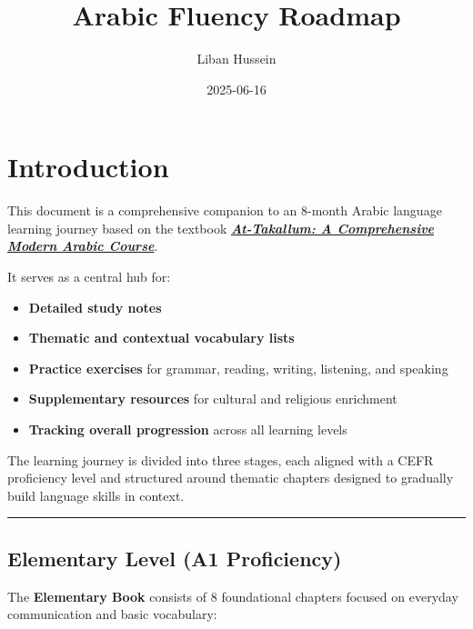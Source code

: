 \documentclass[
  a4paper,
  DIV=11,
  numbers=noendperiod]{scrartcl}
\title{Arabic Fluency Roadmap}
\author{Liban Hussein}
\date{2025-06-16}
\providecommand{\tightlist}{%
  \setlength{\itemsep}{0pt}\setlength{\parskip}{0pt}}
\renewcommand*\contentsname{Table of contents}
\newcommand\contentsname{Table of contents}
\begin{document}
\maketitle

\renewcommand*\contentsname{Table of contents}
{
\hypersetup{linkcolor=}
\setcounter{tocdepth}{3}
\tableofcontents
}

\section{Introduction}\label{sec-intro}

This document is a comprehensive companion to an 8-month Arabic language
learning journey based on the textbook
\href{https://attakallum.com/attakallum-online/login}{\textbf{\emph{At-Takallum:
A Comprehensive Modern Arabic Course}}}.

It serves as a central hub for:

\begin{itemize}
\tightlist
\item
  \textbf{Detailed study notes}\\
\item
  \textbf{Thematic and contextual vocabulary lists}\\
\item
  \textbf{Practice exercises} for grammar, reading, writing, listening,
  and speaking\\
\item
  \textbf{Supplementary resources} for cultural and religious
  enrichment\\
\item
  \textbf{Tracking overall progression} across all learning levels
\end{itemize}

The learning journey is divided into three stages, each aligned with a
CEFR proficiency level and structured around thematic chapters designed
to gradually build language skills in context.

\begin{center}\rule{0.5\linewidth}{0.5pt}\end{center}

\subsection{Elementary Level (A1
Proficiency)}\label{elementary-level-a1-proficiency}

The \textbf{Elementary Book} consists of 8 foundational chapters focused
on everyday communication and basic vocabulary:
\end{document}
